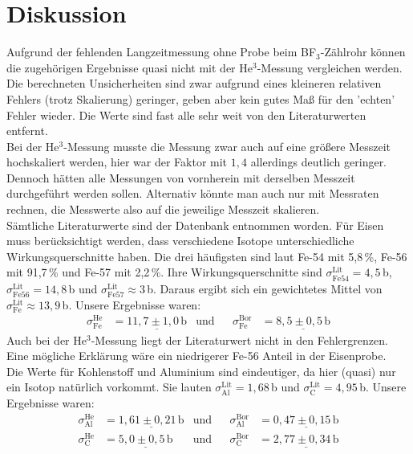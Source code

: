 \documentclass[german, parskip=full]{scrartcl}
\newcommand{\tecxt}{}
\begin{document}
\section{Diskussion}
Aufgrund der fehlenden Langzeitmessung ohne Probe beim BF${}_3$-Zählrohr können die zugehörigen Ergebnisse quasi nicht mit der He${}^3$-Messung vergleichen werden. Die berechneten Unsicherheiten sind zwar aufgrund eines kleineren relativen Fehlers (trotz Skalierung) geringer, geben aber kein gutes Maß für den 'echten' Fehler wieder. Die Werte sind fast alle sehr weit von den Literaturwerten entfernt. \\
Bei der He${}^3$-Messung musste die Messung zwar auch auf eine größere Messzeit hochskaliert werden, hier war der Faktor mit $1,4$ allerdings deutlich geringer. Dennoch hätten alle Messungen von vornherein mit derselben Messzeit durchgeführt werden sollen. Alternativ könnte man auch nur mit Messraten rechnen, die Messwerte also auf die jeweilige Messzeit skalieren.\\
Sämtliche Literaturwerte sind der Datenbank \cite{JANIS} entnommen worden. Für Eisen muss berücksichtigt werden, dass verschiedene Isotope unterschiedliche Wirkungsquerschnitte haben. Die drei häufigsten sind laut \cite{Eisen} Fe-54 mit 5,8\,\%, Fe-56 mit 91,7\,\% und Fe-57 mit 2,2\,\%. Ihre Wirkungsquerschnitte sind $\sigma_\tecxt\text{Fe54}^\tecxt\text{Lit}=4,5\,$b, $\sigma_\tecxt\text{Fe56}^\tecxt\text{Lit}=14,8\,$b und $\sigma_\tecxt\text{Fe57}^\tecxt\text{Lit}\approx 3\,$b. Daraus ergibt sich ein gewichtetes Mittel von $\sigma_\tecxt\text{Fe}^\tecxt\text{Lit}\approx 13,9\,$b. Unsere Ergebnisse waren:
\begin{align*}
\sigma_\tecxt\text{Fe}^\tecxt\text{He}&=\underline{11,7\pm 1,0\,\tecxt\text{b}} &\tecxt\text{und}&&\sigma_\tecxt\text{Fe}^\tecxt\text{Bor}&=\underline{8,5\pm 0,5\,\tecxt\text{b}}
\end{align*}
Auch bei der He${}^3$-Messung liegt der Literaturwert nicht in den Fehlergrenzen. Eine mögliche Erklärung wäre ein niedrigerer Fe-56 Anteil in der Eisenprobe. \\
Die Werte für Kohlenstoff und Aluminium sind eindeutiger, da hier (quasi) nur ein Isotop natürlich vorkommt. Sie lauten $\sigma_\tecxt\text{Al}^\tecxt\text{Lit}=1,68\,$b und $\sigma_\tecxt\text{C}^\tecxt\text{Lit}=4,95\,$b. Unsere Ergebnisse waren:
\begin{align*}
\sigma_\tecxt\text{Al}^\tecxt\text{He}&=\underline{1,61\pm 0,21\,\tecxt\text{b}} &\tecxt\text{und}&&\sigma_\tecxt\text{Al}^\tecxt\text{Bor}&=\underline{0,47\pm 0,15\,\tecxt\text{b}}\\
\sigma_\tecxt\text{C}^\tecxt\text{He}&=\underline{5,0\pm 0,5\,\tecxt\text{b}} &\tecxt\text{und}&&\sigma_\tecxt\text{C}^\tecxt\text{Bor}&=\underline{2,77\pm 0,34\,\tecxt\text{b}}
\end{align*}
\end{document}
